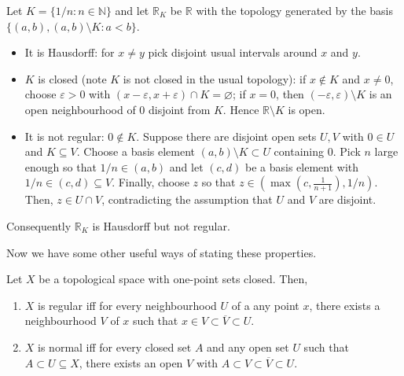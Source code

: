 \begin{example}
Let $K=\{1/n:n\in\mathbb{N}\}$ and let $\mathbb{R}_K$ be $\mathbb{R}$ with the topology generated by the basis $\{(a,b),(a,b)\setminus K:a<b\}$.
\begin{itemize}
    \item It is Hausdorff: for $x\neq y$ pick disjoint usual intervals around $x$ and $y$.
    \item $K$ is closed (note $K$ is not closed in the usual topology): if $x\notin K$ and $x\neq0$, choose $\varepsilon>0$ with $(x-\varepsilon,x+\varepsilon)\cap K=\varnothing$; if $x=0$, then $( -\varepsilon,\varepsilon)\setminus K$ is an open neighbourhood of $0$ disjoint from $K$. Hence $\mathbb{R}\setminus K$ is open.
    \item It is not regular: $0\notin K$. Suppose there are disjoint open sets $U,V$ with $0\in U$ and $K\subseteq V$. Choose a basis element $(a,b)\setminus K\subset U$ containing $0$. Pick $n$ large enough so that $1/n\in(a,b)$ and let $(c,d)$ be a basis element with $1/n\in(c,d)\subseteq V$. Finally, choose $z$ so that $z\in(\max(c,\frac1{n+1}),1/n)$. Then, $z\in U\cap V$, contradicting the assumption that $U$ and $V$ are disjoint.
\end{itemize}
Consequently $\mathbb{R}_K$ is Hausdorff but not regular.
\end{example}

Now we have some other useful ways of stating these properties.

\begin{lemma}\label{lemma:regularity and normal}
    Let $X$ be a topological space with one-point sets closed. Then,
    \begin{enumerate}
        \item $X$ is regular iff for every neighbourhood $U$ of a any point $x$, there exists a neighbourhood $V$ of $x$ such that $x\in V\subset \overline{V}\subset{U}$.
        \item $X$ is normal iff for every closed set $A$ and any open set $U$ such that $A\subset U\subseteq X$, there exists an open $V$ with $A\subset V\subset \overline{V}\subset U$.
    \end{enumerate}
\end{lemma}

